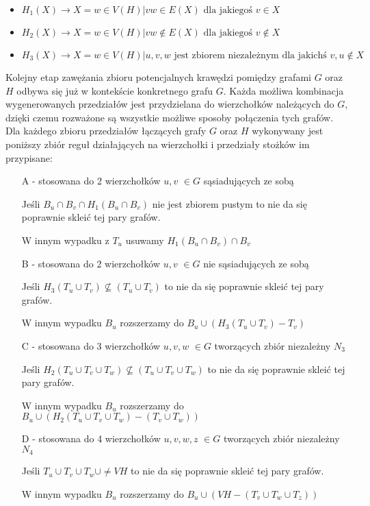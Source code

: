 \begin{itemize}
    
  \item   $H_1(X) \to X = { w \in V(H) | vw \in E(X) \textrm{ dla jakiegoś } v \in X }$ 
  
  \item   $H_2(X) \to X = { w \in V(H) | vw \notin E(X) \textrm{ dla jakiegoś } v \notin X}$
  
  \item   $H_3(X) \to X = { w \in V(H) | { u, v, w } \textrm{ jest zbiorem niezależnym dla jakichś } v, u \notin X}$ 
\end{itemize}
Kolejny etap zawężania zbioru potencjalnych krawędzi pomiędzy grafami $G$ oraz $H$ odbywa się już w kontekście konkretnego grafu $G$. Każda możliwa kombinacja wygenerowanych przedziałów jest  przydzielana do wierzchołków należących do $G$, dzięki czemu rozważone są wszystkie możliwe sposoby połączenia tych grafów. Dla każdego zbioru przedziałów łączących grafy $G$ oraz $H$ wykonywany jest poniższy zbiór reguł działających na wierzchołki i przedziały stożków im przypisane:
\begin{itemize}
  \item[A] - stosowana do 2 wierzchołków $u,v$ $\in G$ sąsiadujących ze sobą 
  
  Jeśli $B_u \cap B_v \cap H_1(B_u \cap B_v)$ nie jest zbiorem pustym to nie da się 
  poprawnie skleić tej pary grafów. 
  
  W innym wypadku z $T_u$ usuwamy $H_1(B_u \cap B_v) \cap B_v $  
  \item[B] - stosowana do 2 wierzchołków $u,v$ $\in G$ nie sąsiadujących ze sobą 
  
  Jeśli $H_3(T_u \cup T_v) \not\subseteq (T_u \cup T_v)$ to nie da się poprawnie skleić tej 
  pary grafów. 
  
  W innym wypadku $B_u$ rozszerzamy do $B_u \cup (H_3(T_u \cup T_v) - T_v)$
  \item[C] - stosowana do 3 wierzchołków $u,v,w$ $\in G$ tworzących zbiór niezależny $N_3$ 
  
  Jeśli $H_2(T_u \cup T_v \cup T_w) \not\subseteq (T_u \cup T_v \cup T_w)$ 
  to nie da się poprawnie skleić tej pary grafów. 
  
  W innym wypadku $B_u$ rozszerzamy do $B_u \cup (H_2(T_u \cup T_v \cup T_w) - (T_v \cup T_w))$
  \item[D] - stosowana do 4 wierzchołków $u,v,w,z$ $\in G$ tworzących zbiór niezależny $N_4$  
  
  Jeśli $T_u \cup T_v \cup T_w \cup \neq VH $ to nie da się poprawnie skleić tej pary grafów.
  
  W innym wypadku $B_u$ rozszerzamy do $B_u \cup (VH - (T_v \cup T_w \cup T_z))$
\end{itemize}


